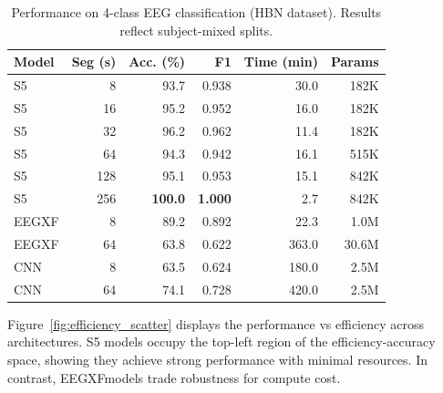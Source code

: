 \documentclass{article}
\newcommand{\eegtrans}{EEGXF}
\begin{document}
\begin{table}[t]
  \caption{Performance on 4-class EEG classification (HBN dataset). Results reflect subject-mixed splits.}
  
  \label{tab:results}
  \centering
  \begin{tabular}{lrrrrr}
    \toprule
    \textbf{Model} & \textbf{Seg (s)} & \textbf{Acc. (\%)} & \textbf{F1} & \textbf{Time (min)} & \textbf{Params} \\
    \midrule
    S5 & 8 & 93.7 & 0.938 & 30.0 & 182K \\
    S5 & 16 & 95.2 & 0.952 & 16.0 & 182K \\
    S5 & 32 & 96.2 & 0.962 & 11.4 & 182K \\
    S5 & 64 & 94.3 & 0.942 & 16.1 & 515K \\
    S5 & 128 & 95.1 & 0.953 & 15.1 & 842K \\
    S5 & 256 & \textbf{100.0} & \textbf{1.000} & 2.7 & 842K \\
    \eegtrans & 8 & 89.2 & 0.892 & 22.3 & 1.0M \\
    \eegtrans & 64 & 63.8 & 0.622 & 363.0 & 30.6M \\
    CNN & 8 & 63.5 & 0.624 & 180.0 & 2.5M \\
    CNN & 64 & 74.1 & 0.728 & 420.0 & 2.5M \\
    \bottomrule
  \end{tabular}
\end{table}

Figure~\ref{fig:efficiency_scatter} displays the performance vs efficiency across architectures. 
S5 models occupy the top-left region of the efficiency-accuracy space, showing they achieve strong performance with minimal resources. In contrast, \eegtrans models trade robustness for compute cost.
\end{document}
